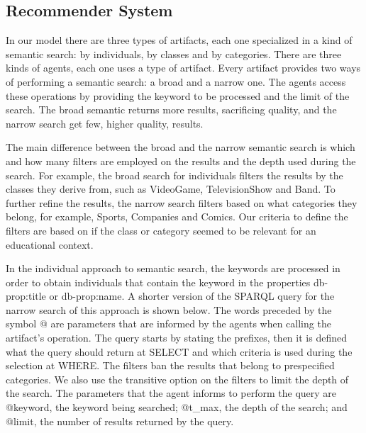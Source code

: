 \documentclass[a4paper,twoside]{article}
\begin{document}
\subsection{Recommender System}
\label{sec:recsys}

\noindent In our model there are three types of artifacts, each one specialized in a kind of semantic search: by individuals, by classes and by categories. There are three kinds of agents, each one uses a type of artifact. Every artifact provides two ways of performing a semantic search: a broad and a narrow one. The agents access these operations by providing the keyword to be processed and the limit of the search. The broad semantic returns more results, sacrificing quality, and the narrow search get few, higher quality, results.

The main difference between the broad and the narrow semantic search is which and how many filters are employed on the results and the depth used during the search. For example, the broad search for individuals filters the results by the classes they derive from, such as VideoGame, TelevisionShow and Band. To further refine the results, the narrow search filters based on what categories they belong, for example, Sports, Companies and Comics. Our criteria to define the filters are based on if the class or category seemed to be relevant for an educational context.

In the individual approach to semantic search, the keywords are processed in order to obtain individuals that contain the keyword in the properties db-prop:title or db-prop:name. A shorter version of the SPARQL query for the narrow search of this approach is shown below. The words preceded by the symbol @ are parameters that are informed by the agents when calling the artifact's operation. The query starts by stating the prefixes, then it is defined what the query should return at SELECT and which criteria is used during the selection at WHERE. The filters ban the results that belong to prespecified categories. We also use the transitive option on the filters to limit the depth of the search. The parameters that the agent informs to perform the query are @keyword, the keyword being searched; @t\_max, the depth of the search; and @limit, the number of results returned by the query.
\end{document}
